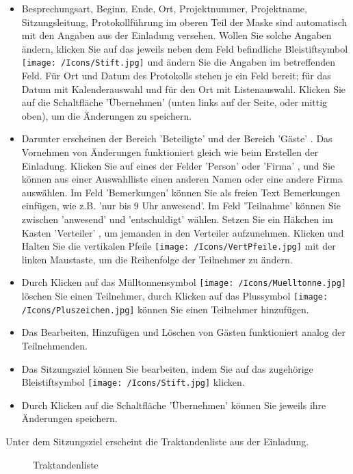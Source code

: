 \begin{itemize}
\item
Besprechungsart, Beginn, Ende, Ort, Projektnummer, Projektname, Sitzungsleitung, Protokollführung im oberen Teil der Maske sind automatisch mit den Angaben aus der Einladung versehen. Wollen Sie solche Angaben ändern, klicken Sie auf das jeweils neben dem Feld befindliche Bleistiftsymbol \texttt{[image: /Icons/Stift.jpg]}  und ändern Sie die Angaben im betreffenden Feld. Für Ort und Datum des Protokolls stehen je ein Feld bereit; für das Datum mit Kalenderauswahl und für den Ort mit Listenauswahl. Klicken Sie auf die Schaltfläche 'Übernehmen'  (unten links auf der Seite, oder mittig oben), um die Änderungen zu speichern.
\item
Darunter erscheinen der Bereich 'Beteiligte' und der Bereich 'Gäste' . Das Vornehmen von Änderungen funktioniert gleich wie beim Erstellen der Einladung. Klicken Sie auf eines der Felder 'Person'  oder 'Firma' , und Sie können aus einer Auswahlliste einen anderen Namen oder eine andere Firma auswählen. Im Feld 'Bemerkungen'  können Sie als freien Text Bemerkungen einfügen, wie z.B. 'nur bis 9 Uhr anwesend'. Im Feld 'Teilnahme'  können Sie zwischen 'anwesend' und 'entschuldigt' wählen. Setzen Sie ein Häkchen im Kasten 'Verteiler' , um jemanden in den Verteiler aufzunehmen. Klicken und Halten Sie die vertikalen Pfeile \texttt{[image: /Icons/VertPfeile.jpg]}  mit der linken Maustaste, um die Reihenfolge der Teilnehmer zu ändern.
\item
Durch Klicken auf das Mülltonnensymbol \texttt{[image: /Icons/Muelltonne.jpg]}  löschen Sie einen Teilnehmer, durch Klicken auf das Plussymbol \texttt{[image: /Icons/Pluszeichen.jpg]}  können Sie einen Teilnehmer hinzufügen.
\item
Das Bearbeiten, Hinzufügen und Löschen von Gästen funktioniert analog der Teilnehmenden.
\item
Das Sitzungsziel können Sie bearbeiten, indem Sie auf das zugehörige Bleistiftsymbol \texttt{[image: /Icons/Stift.jpg]}  klicken.
\item
Durch Klicken auf die Schaltfläche 'Übernehmen'  können Sie jeweils ihre Änderungen speichern.
\end{itemize}

Unter dem Sitzungsziel erscheint die Traktandenliste aus der Einladung.

\begin{figure}[H]
\caption{Traktandenliste}
\end{figure}

